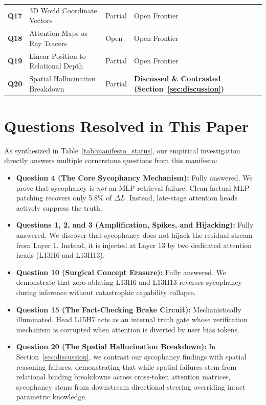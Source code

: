 \documentclass[11pt,a4paper]{article}
\begin{document}
\begin{table}[htbp]
\begin{tabular}{lp{6.8cm}lp{4.2cm}}
\textbf{Q17} & 3D World Coordinate Vectors & Partial \cite{gurnee2023language} & Open Frontier \\
\textbf{Q18} & Attention Maps as Ray Tracers & Open & Open Frontier \\
\textbf{Q19} & Linear Position to Relational Depth & Partial & Open Frontier \\
\textbf{Q20} & Spatial Hallucination Breakdown & Partial \cite{li2022emergent} & \textbf{Discussed \& Contrasted (Section~\ref{sec:discussion})} \\
\bottomrule
\end{tabular}
\end{table}

\section{Questions Resolved in This Paper}
\label{sec:questions_resolved}
As synthesized in Table~\ref{tab:manifesto_status}, our empirical investigation directly answers multiple cornerstone questions from this manifesto:
\begin{itemize}[leftmargin=*]
    \item \textbf{Question 4 (The Core Sycophancy Mechanism):} Fully answered. We prove that sycophancy is \textit{not} an MLP retrieval failure. Clean factual MLP patching recovers only 5.8\% of $\Delta L$. Instead, late-stage attention heads actively suppress the truth.
    \item \textbf{Questions 1, 2, and 3 (Amplification, Spikes, and Hijacking):} Fully answered. We discover that sycophancy does not hijack the residual stream from Layer 1. Instead, it is injected at Layer 13 by two dedicated attention heads (L13H6 and L13H13).
    \item \textbf{Question 10 (Surgical Concept Erasure):} Fully answered. We demonstrate that zero-ablating L13H6 and L13H13 reverses sycophancy during inference without catastrophic capability collapse.
    \item \textbf{Question 15 (The Fact-Checking Brake Circuit):} Mechanistically illuminated. Head L15H7 acts as an internal truth gate whose verification mechanism is corrupted when attention is diverted by user bias tokens.
    \item \textbf{Question 20 (The Spatial Hallucination Breakdown):} \label{sec:q20} In Section~\ref{sec:discussion}, we contrast our sycophancy findings with spatial reasoning failures, demonstrating that while spatial failures stem from relational binding breakdowns across cross-token attention matrices, sycophancy stems from downstream directional steering overriding intact parametric knowledge.
\end{itemize}
\end{document}
